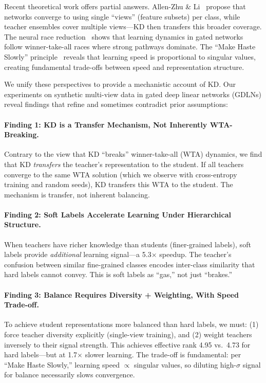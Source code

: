 \documentclass{article}
\begin{document}
Recent theoretical work offers partial answers. Allen-Zhu \& Li~\cite{allen2023towards} propose that networks converge to using single ``views'' (feature subsets) per class, while teacher ensembles cover multiple views---KD then transfers this broader coverage. The neural race reduction~\cite{saxe2022neural} shows that learning dynamics in gated networks follow winner-take-all races where strong pathways dominate. The ``Make Haste Slowly'' principle~\cite{jarvis2025makehaste} reveals that learning speed is proportional to singular values, creating fundamental trade-offs between speed and representation structure.

We unify these perspectives to provide a mechanistic account of KD. Our experiments on synthetic multi-view data in gated deep linear networks (GDLNs) reveal findings that refine and sometimes contradict prior assumptions:

\paragraph{Finding 1: KD is a Transfer Mechanism, Not Inherently WTA-Breaking.}
Contrary to the view that KD ``breaks'' winner-take-all (WTA) dynamics, we find that KD \textit{transfers} the teacher's representation to the student. If all teachers converge to the same WTA solution (which we observe with cross-entropy training and random seeds), KD transfers this WTA to the student. The mechanism is transfer, not inherent balancing.

\paragraph{Finding 2: Soft Labels Accelerate Learning Under Hierarchical Structure.}
When teachers have richer knowledge than students (finer-grained labels), soft labels provide \textit{additional} learning signal---a 5.3$\times$ speedup. The teacher's confusion between similar fine-grained classes encodes inter-class similarity that hard labels cannot convey. This is soft labels as ``gas,'' not just ``brakes.''

\paragraph{Finding 3: Balance Requires Diversity + Weighting, With Speed Trade-off.}
To achieve student representations more balanced than hard labels, we must: (1) force teacher diversity explicitly (single-view training), and (2) weight teachers inversely to their signal strength. This achieves effective rank 4.95 vs.\ 4.73 for hard labels---but at 1.7$\times$ slower learning. The trade-off is fundamental: per ``Make Haste Slowly,'' learning speed $\propto$ singular values, so diluting high-$\sigma$ signal for balance necessarily slows convergence.
\end{document}
